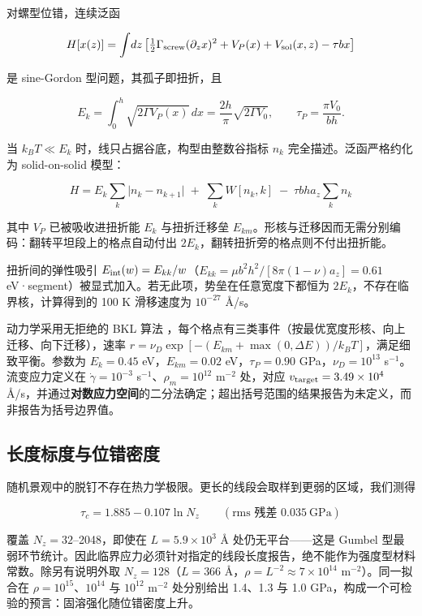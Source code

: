 \documentclass[11pt,a4paper]{article}
\begin{document}
对螺型位错，连续泛函

\[H[x(z)] = \int\!dz\left[\tfrac12\Gamma_{\rm screw}(\partial_z x)^2 + V_P(x) + V_{\rm sol}(x,z) - \tau b x\right]\]

是 sine-Gordon 型问题，其孤子即扭折，且

\[E_k = \int_0^h\!\sqrt{2\Gamma V_P(x)}\,dx = \frac{2h}{\pi}\sqrt{2\Gamma V_0},\qquad \tau_P = \frac{\pi V_0}{bh}.\]

当 \(k_BT \ll E_k\) 时，线只占据谷底，构型由整数谷指标 \(n_k\) 完全描述。泛函严格约化为 solid-on-solid 模型：

\[\boxed{\;H = E_k\sum_k\bigl|n_k - n_{k+1}\bigr| \;+\; \sum_k W[n_k,k] \;-\; \tau b h a_z\sum_k n_k\;}\]

其中 \(V_P\) 已被吸收进扭折能 \(E_k\) 与扭折迁移垒 \(E_{km}\)。形核与迁移因而无需分别编码：翻转平坦段上的格点自动付出 \(2E_k\)，翻转扭折旁的格点则不付出扭折能。

扭折间的弹性吸引 \(E_{\rm int}(w) = E_{kk}/w\)（\(E_{kk} = \mu b^2h^2/[8\pi(1-\nu)a_z] = 0.61\) eV·segment）被显式加入。若无此项，势垒在任意宽度下都恒为 \(2E_k\)，不存在临界核，计算得到的 100 K 滑移速度为 \(10^{-27}\) Å/s。

动力学采用无拒绝的 BKL 算法 \cite{bortz1975}，每个格点有三类事件（按最优宽度形核、向上迁移、向下迁移），速率 \(r = \nu_D\exp[-(E_{km} + \max(0,\Delta E))/k_BT]\)，满足细致平衡。参数为 \(E_k = 0.45\) eV，\(E_{km} = 0.02\) eV，\(\tau_P = 0.90\) GPa，\(\nu_D = 10^{13}\) s\(^{-1}\)。流变应力定义在 \(\dot\gamma = 10^{-3}\) s\(^{-1}\)、\(\rho_m = 10^{12}\) m\(^{-2}\) 处，对应 \(v_{\rm target} = 3.49\times10^4\) Å/s，并通过\textbf{对数应力空间}的二分法确定；超出括号范围的结果报告为未定义，而非报告为括号边界值。

\hypertarget{ux957fux5ea6ux6807ux5ea6ux4e0eux4f4dux9519ux5bc6ux5ea6}{%
\subsection{长度标度与位错密度}\label{sec:ux957fux5ea6ux6807ux5ea6ux4e0eux4f4dux9519ux5bc6ux5ea6}}

随机景观中的脱钉不存在热力学极限。更长的线段会取样到更弱的区域，我们测得

\[\tau_c = 1.885 - 0.107\ln N_z\qquad(\text{rms 残差 }0.035\ \text{GPa})\]

覆盖 \(N_z = 32\)--2048，即使在 \(L = 5.9\times10^3\) Å 处仍无平台------这是 Gumbel 型最弱环节统计。因此临界应力必须针对指定的线段长度报告，绝不能作为强度型材料常数。除另有说明外取 \(N_z = 128\)（\(L = 366\) Å，\(\rho = L^{-2}\approx7\times10^{14}\) m\(^{-2}\)）。同一拟合在 \(\rho = 10^{15}\)、\(10^{14}\) 与 \(10^{12}\) m\(^{-2}\) 处分别给出 1.4、1.3 与 1.0 GPa，构成一个可检验的预言：固溶强化随位错密度上升。
\end{document}

